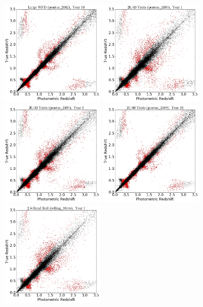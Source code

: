 \begin{figure}
\begin{center}
\includegraphics[width=5cm,trim={0cm 0cm 0cm 0cm},clip]{figures/tzpz_pontus2002_10.png}
\includegraphics[width=5cm,trim={0cm 0cm 0cm 0cm},clip]{figures/tzpz_pontus2489_1.png}
\includegraphics[width=5cm,trim={0cm 0cm 0cm 0cm},clip]{figures/tzpz_pontus2489_3.png}
\includegraphics[width=5cm,trim={0cm 0cm 0cm 0cm},clip]{figures/tzpz_pontus2489_10.png}
\includegraphics[width=5cm,trim={0cm 0cm 0cm 0cm},clip]{figures/tzpz_rolling10yrs_1.png}

\end{center}
\end{figure}
